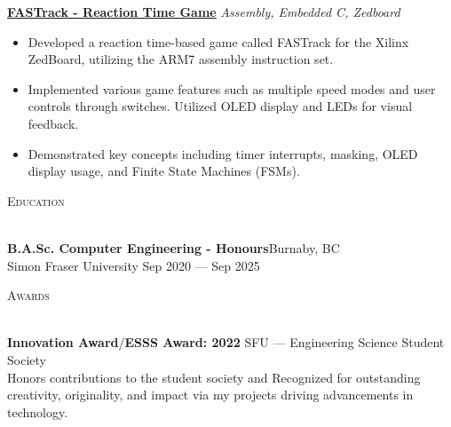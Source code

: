 \documentclass[a4paper]{article}
\newcommand{\lineunder} {
    \vspace*{-8pt} \\
    \hspace*{-18pt} \hrulefill\\
}
\newcommand{\header} [1] {
    {\hspace*{-18pt}\vspace*{6pt} \textsc{#1}}
    \vspace*{-6pt} \lineunder{}
}
\begin{document}
\href{https://github.com/SatireSage/FASTrack}{\textbf{FASTrack - Reaction Time Game}} {\sl Assembly, Embedded C, Zedboard\/}
\vspace{-2mm}
\begin{itemize} \itemsep-3pt
    \item Developed a reaction time-based game called FASTrack for the Xilinx ZedBoard, utilizing the ARM7 assembly instruction set.
    \item Implemented various game features such as multiple speed modes and user controls through switches. Utilized OLED display and LEDs for visual feedback.
    \item Demonstrated key concepts including timer interrupts, masking, OLED display usage, and Finite State Machines (FSMs).
\end{itemize}

\header{Education}
\textbf{B.A.Sc. Computer Engineering - Honours}\hfill Burnaby, BC\\
Simon Fraser University \hfill Sep 2020 --- Sep 2025\\
\vspace{1mm}

\header{Awards}
\textbf{Innovation Award}/\textbf{ESSS Award: 2022} \hfill SFU --- Engineering Science Student Society\\
Honors contributions to the student society and Recognized for outstanding creativity, originality, and impact via my projects driving advancements in technology.\\
\vspace*{1mm}
\end{document}
